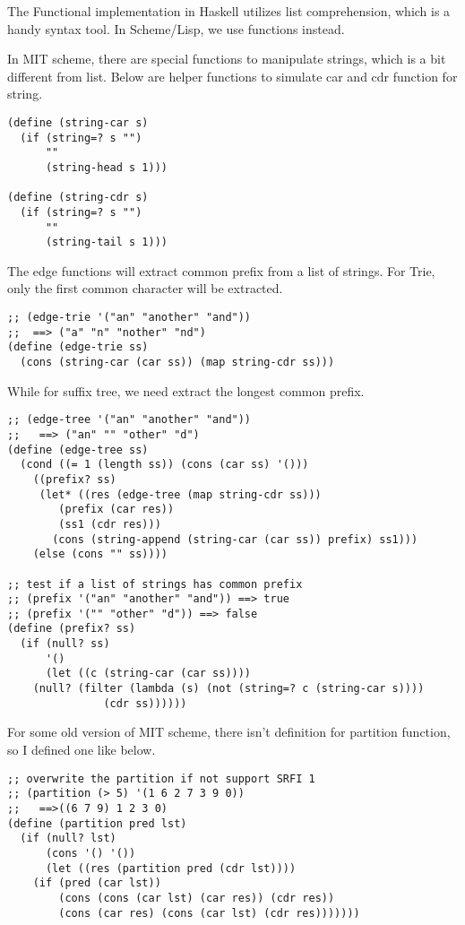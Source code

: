 \documentclass{article}
\begin{document}
The Functional implementation in Haskell utilizes list comprehension, which
is a handy syntax tool. In Scheme/Lisp, we use functions instead.

In MIT scheme, there are special functions to manipulate strings, which
is a bit different from list. Below are helper functions to simulate
car and cdr function for string.

\lstset{language=lisp}
\begin{lstlisting}
(define (string-car s)
  (if (string=? s "")
      ""
      (string-head s 1)))

(define (string-cdr s)
  (if (string=? s "")
      ""
      (string-tail s 1)))
\end{lstlisting}

The edge functions will extract common prefix from a list of strings.
For Trie, only the first common character will be extracted.

\begin{lstlisting}
;; (edge-trie '("an" "another" "and"))
;;  ==> ("a" "n" "nother" "nd")
(define (edge-trie ss)
  (cons (string-car (car ss)) (map string-cdr ss)))
\end{lstlisting}

While for suffix tree, we need extract the longest common prefix.

\begin{lstlisting}
;; (edge-tree '("an" "another" "and"))
;;   ==> ("an" "" "other" "d")
(define (edge-tree ss)
  (cond ((= 1 (length ss)) (cons (car ss) '()))
	((prefix? ss)
	 (let* ((res (edge-tree (map string-cdr ss)))
		(prefix (car res))
		(ss1 (cdr res)))
	   (cons (string-append (string-car (car ss)) prefix) ss1)))
	(else (cons "" ss))))

;; test if a list of strings has common prefix
;; (prefix '("an" "another" "and")) ==> true
;; (prefix '("" "other" "d")) ==> false
(define (prefix? ss)
  (if (null? ss)
      '()
      (let ((c (string-car (car ss))))
	(null? (filter (lambda (s) (not (string=? c (string-car s))))
		       (cdr ss))))))
\end{lstlisting}

For some old version of MIT scheme, there isn't definition for
partition function, so I defined one like below.

\begin{lstlisting}
;; overwrite the partition if not support SRFI 1
;; (partition (> 5) '(1 6 2 7 3 9 0))
;;   ==>((6 7 9) 1 2 3 0)
(define (partition pred lst)
  (if (null? lst)
      (cons '() '())
      (let ((res (partition pred (cdr lst))))
	(if (pred (car lst))
	    (cons (cons (car lst) (car res)) (cdr res))
	    (cons (car res) (cons (car lst) (cdr res)))))))
\end{lstlisting}
\end{document}
